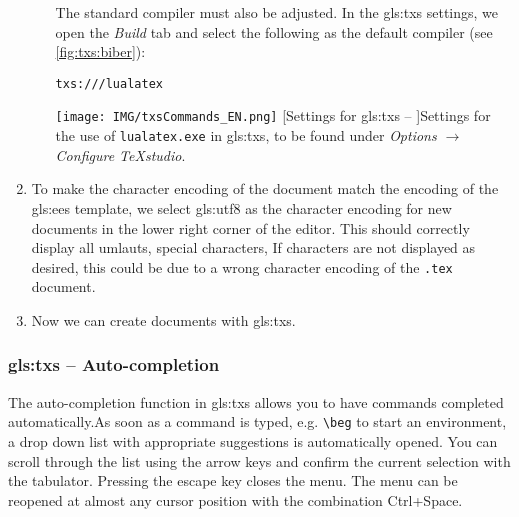 \begin{enumerate}
\begin{enumerate}
		The standard compiler must also be adjusted. In the \gls{gls:txs} settings, we open the \textit{Build} tab and select the following as the default compiler (see \autoref{fig:txs:biber}): 
		
		\begin{minipage}{\linewidth}
			\begin{lstlisting}[language=none, caption={[Settings for \gls{gls:txs} -- {\LuaLaTeX} Compiler]Settings for using \texttt{lualatex.exe} as the default compiler in \gls{gls:txs}, located at \textit{Options $\rightarrow$ Configure TeXstudio $\rightarrow$ Build}. \label{lst:editor:txs:lualatex_2}}]
			txs:///lualatex
			\end{lstlisting}
		\end{minipage}%
		
		\begin{minipage}{\linewidth}
			\centering
			\texttt{[image: IMG/txsCommands\_EN.png]}
			[Settings for \gls{gls:txs} -- \LuaLaTeX]{Settings for the use of \texttt{lualatex.exe} in \gls{gls:txs}, to be found under \textit{Options $\rightarrow$ Configure TeXstudio}.}
			\label{fig:txs:profile}
		\end{minipage}%
	\end{enumerate}
	\item To make the character encoding of the document match the encoding of the \gls{gls:ees} template, we select \gls{gls:utf8} as the character encoding for new documents in the lower right corner of the editor. This should correctly display all umlauts, special characters, \etc If characters are not displayed as desired, this could be due to a wrong character encoding of the \texttt{.tex} document.
	\item Now we can create documents with \gls{gls:txs}.
\end{enumerate}




\subsubsection{\gls*{gls:txs} -- Auto-completion}
\label{sec:txs:autocomplete}
The auto-completion function in \gls{gls:txs} allows you to have commands completed automatically.As soon as a command is typed, e.g. \lstinline|\beg| to start an environment, a drop down list with appropriate suggestions is automatically opened.  You can scroll through the list using the arrow keys and confirm the current selection with the tabulator. Pressing the escape key closes the menu. The menu can be reopened at almost any cursor position with the combination Ctrl+Space.




